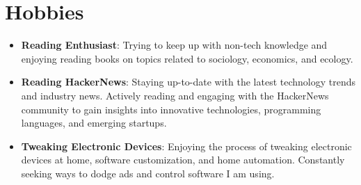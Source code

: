 \documentclass[letterpaper,11pt]{article}
\newcommand{\resumeItem}[2]{
  \item\small{
    \textbf{#1}{: #2 \vspace{-2pt}}
  }
}
\newcommand{\resumeSubItem}[2]{\resumeItem{#1}{#2}\vspace{-4pt}}
\newcommand{\resumeSubHeadingListStart}{\begin{itemize}[leftmargin=*]}
\newcommand{\resumeSubHeadingListEnd}{\end{itemize}}
\begin{document}
\section{Hobbies}
\resumeSubHeadingListStart
\resumeItem{Reading Enthusiast}
{Trying to keep up with non-tech knowledge and enjoying reading books on topics related to sociology, economics, and ecology.}
\resumeSubItem{Reading HackerNews}
{Staying up-to-date with the latest technology trends and industry news. Actively reading and engaging with the HackerNews community to gain insights into innovative technologies, programming languages, and emerging startups.}
\resumeSubItem{Tweaking Electronic Devices}
{Enjoying the process of tweaking electronic devices at home, software customization, and home automation. Constantly seeking ways to dodge ads and control software I am using.}
\resumeSubHeadingListEnd
\end{document}
